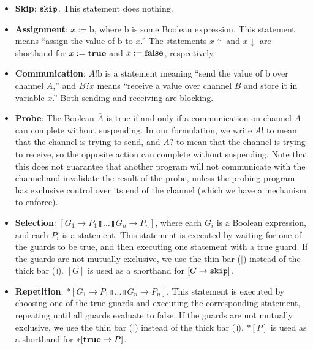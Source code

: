 \documentclass[times, 10pt]{article}
\def\Skip{\hbox{\tt skip}}
\def\true{\hbox{\bf true}}
\def\false{\hbox{\bf false}}
\begin{document}
\begin{itemize}

\item \textbf{Skip}: $\Skip$.  This statement does nothing.

\item \textbf{Assignment}: $x := \mathrm{b}$, where $\mathrm{b}$ is some Boolean
expression.  This statement means ``assign the value of $\mathrm{b}$ to $x$.'' The
statements $x\uparrow$ and $x\downarrow$ are shorthand for $x := \true$ and $x
:= \false$, respectively.

\item \textbf{Communication}: $A!\mathrm{b}$ is a statement meaning ``send the
value of $\mathrm{b}$ over channel $A$,'' and $B?x$ means ``receive a value over
channel $B$ and store it in variable $x$.''  Both sending and receiving are
blocking.

\item \textbf{Probe}: The Boolean $\overline{A}$ is true if and only if a
communication on channel $A$ can complete without suspending.  In our
formulation, we write $\overline{A!}$ to mean that the channel is trying to
send, and $\overline{A?}$ to mean that the channel is trying to receive, so the
opposite action can complete without suspending.  Note that this does not
guarantee that another program will not communicate with the channel and
invalidate the result of the probe, unless the probing program has exclusive
control over its end of the channel (which we have a mechanism to enforce).

\item \textbf{Selection}: $[G_1 \rightarrow P_1 \talloblong ... \talloblong G_n
\rightarrow P_n]$, where each $G_i$ is a Boolean expression, and each $P_i$ is a
statement.  This statement is executed by waiting for one of the guards to be
true, and then executing one statement with a true guard.  If the guards are not
mutually exclusive, we use the thin bar ($|$) instead of the thick bar
($\talloblong$). $[G]$ is used as a shorthand for $[G \rightarrow \Skip]$.

\item \textbf{Repetition}: $*[G_1 \rightarrow P_1 \talloblong ... \talloblong
G_n \rightarrow P_n]$. This statement is executed by choosing one of the true
guards and executing the corresponding statement, repeating until all guards
evaluate to false. If the guards are not mutually exclusive, we use the thin bar
($|$) instead of the thick bar ($\talloblong$). $*[P]$ is used as a shorthand for
$*[\true \rightarrow P]$.


\end{itemize}
\end{document}
